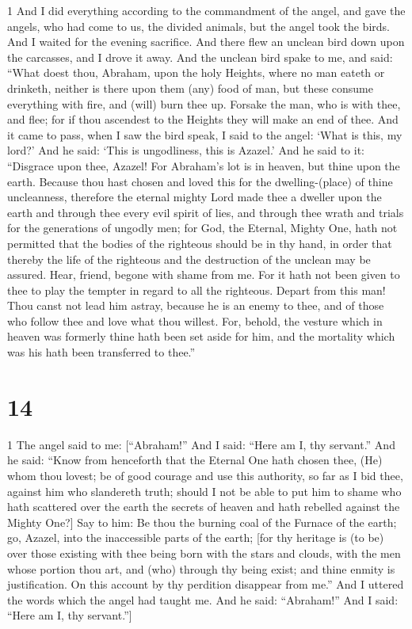 \par 1 And I did everything according to the commandment of the angel, and gave the angels, who had come to us, the divided animals, but the angel took the birds. And I waited for the evening sacrifice. And there flew an unclean bird down upon the carcasses, and I drove it away. And the unclean bird spake to me, and said: “What doest thou, Abraham, upon the holy Heights, where no man eateth or drinketh, neither is there upon them (any) food of man, but these consume everything with fire, and (will) burn thee up. Forsake the man, who is with thee, and flee; for if thou ascendest to the Heights they will make an end of thee. And it came to pass, when I saw the bird speak, I said to the angel: ‘What is this, my lord?’ And he said: ‘This is ungodliness, this is Azazel.’ And he said to it: “Disgrace upon thee, Azazel! For Abraham's lot is in heaven, but thine upon the earth. Because thou hast chosen and loved this for the dwelling-(place) of thine uncleanness, therefore the eternal mighty Lord made thee a dweller upon the earth and through thee every evil spirit of lies, and through thee wrath and trials for the generations of ungodly men; for God, the Eternal, Mighty One, hath not permitted that the bodies of the righteous should be in thy hand, in order that thereby the life of the righteous and the destruction of the unclean may be assured. Hear, friend, begone with shame from me. For it hath not been given to thee to play the tempter in regard to all the righteous. Depart from this man! Thou canst not lead him astray, because he is an enemy to thee, and of those who follow thee and love what thou willest. For, behold, the vesture which in heaven was formerly thine hath been set aside for him, and the mortality which was his hath been transferred to thee.”

\chapter{14}

\par 1 The angel said to me: [“Abraham!” And I said: “Here am I, thy servant.” And he said: “Know from henceforth that the Eternal One hath chosen thee, (He) whom thou lovest; be of good courage and use this authority, so far as I bid thee, against him who slandereth truth; should I not be able to put him to shame who hath scattered over the earth the secrets of heaven and hath rebelled against the Mighty One?] Say to him: Be thou the burning coal of the Furnace of the earth; go, Azazel, into the inaccessible parts of the earth; [for thy heritage is (to be) over those existing with thee being born with the stars and clouds, with the men whose portion thou art, and (who) through thy being exist; and thine enmity is justification. On this account by thy perdition disappear from me.” And I uttered the words which the angel had taught me. And he said: “Abraham!” And I said: “Here am I, thy servant.”]

